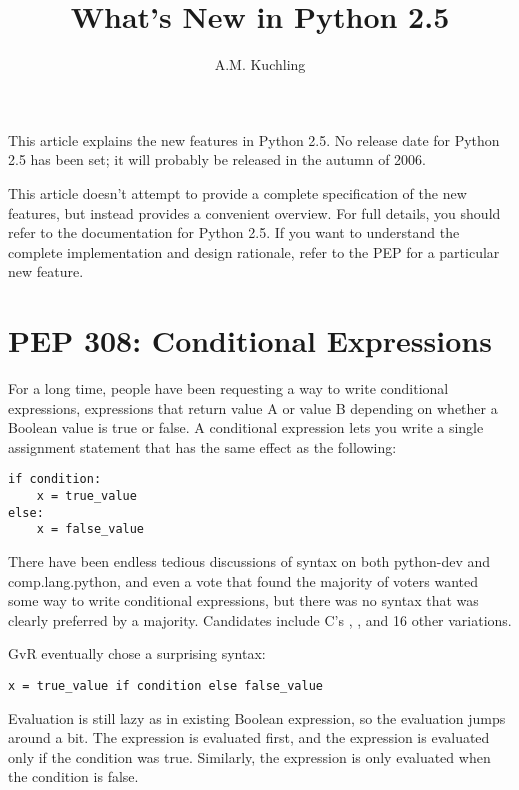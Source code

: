\documentclass{howto}
\title{What's New in Python 2.5}
\author{A.M. Kuchling}
\begin{document}
\maketitle
\tableofcontents

This article explains the new features in Python 2.5.  No release date
for Python 2.5 has been set; it will probably be released in the
autumn of 2006.


This article doesn't attempt to provide a complete specification of
the new features, but instead provides a convenient overview.  For
full details, you should refer to the documentation for Python 2.5.
If you want to understand the complete implementation and design
rationale, refer to the PEP for a particular new feature.


\section{PEP 308: Conditional Expressions}

For a long time, people have been requesting a way to write
conditional expressions, expressions that return value A or value B
depending on whether a Boolean value is true or false.  A conditional
expression lets you write a single assignment statement that has the
same effect as the following:

\begin{verbatim}
if condition:
    x = true_value
else:
    x = false_value
\end{verbatim}

There have been endless tedious discussions of syntax on both
python-dev and comp.lang.python, and even a vote that found the
majority of voters wanted some way to write conditional expressions,
but there was no syntax that was clearly preferred by a majority.
Candidates include C's ,
, and 16 other variations.

GvR eventually chose a surprising syntax:

\begin{verbatim}
x = true_value if condition else false_value
\end{verbatim}

Evaluation is still lazy as in existing Boolean expression, so the
evaluation jumps around a bit.  The  expression is
evaluated first, and the  expression is evaluated only
if the condition was true.  Similarly, the 
expression is only evaluated when the condition is false.
\end{document}
